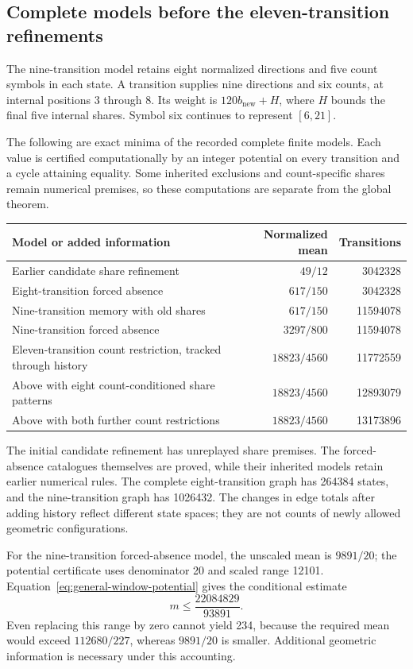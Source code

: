 \documentclass[11pt,a4paper]{article}
\theoremstyle{definition}
\theoremstyle{remark}
\begin{document}
\subsection{Complete models before the eleven-transition refinements}
The nine-transition model retains eight normalized directions and five count symbols in each state. A transition supplies nine directions and six counts, at internal positions 3 through 8. Its weight is $120b_{\mathrm{new}}+H$, where $H$ bounds the final five internal shares. Symbol six continues to represent $[6,21]$.

The following are exact minima of the recorded complete finite models. Each value is certified computationally by an integer potential on every transition and a cycle attaining equality. Some inherited exclusions and count-specific shares remain numerical premises, so these computations are separate from the global theorem.
\begin{center}\small
\begin{tabular}{p{}r r}
\toprule
Model or added information & Normalized mean & Transitions\\\midrule
Earlier candidate share refinement & $49/12$ & 3042328\\
Eight-transition forced absence & $617/150$ & 3042328\\
Nine-transition memory with old shares & $617/150$ & 11594078\\
Nine-transition forced absence & $3297/800$ & 11594078\\
Eleven-transition count restriction, tracked through history & $18823/4560$ & 11772559\\
Above with eight count-conditioned share patterns & $18823/4560$ & 12893079\\
Above with both further count restrictions & $18823/4560$ & 13173896\\
\bottomrule
\end{tabular}
\end{center}
The initial candidate refinement has unreplayed share premises. The forced-absence catalogues themselves are proved, while their inherited models retain earlier numerical rules. The complete eight-transition graph has 264384 states, and the nine-transition graph has 1026432. The changes in edge totals after adding history reflect different state spaces; they are not counts of newly allowed geometric configurations.

For the nine-transition forced-absence model, the unscaled mean is $9891/20$; the potential certificate uses denominator 20 and scaled range 12101. Equation~\eqref{eq:general-window-potential} gives the conditional estimate
\[
m\le\frac{22084829}{93891}.
\]
Even replacing this range by zero cannot yield 234, because the required mean would exceed $112680/227$, whereas $9891/20$ is smaller. Additional geometric information is necessary under this accounting.
\end{document}
